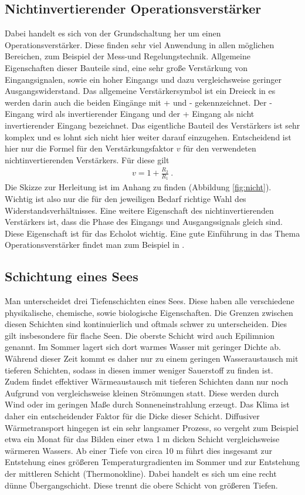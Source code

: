 \documentclass[12pt,a4paper,titlepage,headinclude,bibtotoc]{scrartcl}
\numberwithin{equation}{subsection}
\begin{document}
\subsection{Nichtinvertierender Operationsverstärker}
\label{sec:teoverstaerker}
Dabei handelt es sich von der Grundschaltung her um einen Operationsverstärker.
Diese finden sehr viel Anwendung in allen möglichen Bereichen, zum Beispiel der Mess-und Regelungstechnik. 
Allgemeine Eigenschaften dieser Bauteile sind, eine sehr große Verstärkung von Eingangsignalen, sowie ein hoher Eingangs und dazu vergleichsweise geringer Ausgangswiderstand.
Das allgemeine Verstärkersymbol ist ein Dreieck in es werden darin auch die beiden
Eingänge mit + und - gekennzeichnet.
Der - Eingang wird als invertierender Eingang und 
der + Eingang als nicht invertierender Eingang bezeichnet.
Das eigentliche Bauteil des Verstärkers ist sehr komplex und es lohnt sich nicht hier 
weiter darauf einzugehen.
Entscheidend ist hier nur die Formel für den Verstärkungsfaktor $v$ für den verwendeten 
nichtinvertierenden Verstärkers. 
Für diese gilt
\begin{align}
 v = 1 + \frac{R_2}{R_1}~.\label{eq:verst}
\end{align}
Die Skizze zur Herleitung ist im Anhang zu finden (Abbildung \ref{fig:nicht}).
Wichtig ist also nur die für den jeweiligen Bedarf richtige Wahl des Widerstandsverhältnisses.
Eine weitere Eigenschaft des nichtinvertierenden Verstärkers ist, dass die Phase des Eingangs und Ausgangssignals gleich sind.
Diese Eigenschaft ist für das Echolot wichtig. Eine gute Einführung in das Thema Operationsverstärker findet man zum Beispiel in \cite{op}.


\subsection{Schichtung eines Sees}

Man unterscheidet drei Tiefenschichten eines Sees.
Diese haben alle verschiedene physikalische, chemische, sowie biologische Eigenschaften.
Die Grenzen zwischen diesen Schichten sind kontinuierlich und oftmals schwer zu unterscheiden. 
Dies gilt insbesondere für flache Seen.
Die oberste Schicht wird auch Epilimnion genannt. 
Im Sommer lagert sich dort warmes Wasser mit geringer Dichte ab.
Während dieser Zeit kommt es daher nur zu einem geringen Wasseraustausch mit tieferen Schichten, sodass in diesen immer weniger Sauerstoff zu finden ist.
Zudem findet effektiver Wärmeaustausch mit tieferen Schichten dann nur noch Aufgrund von vergleichsweise kleinen Strömungen statt.
Diese werden durch Wind oder im geringen Maße durch Sonneneinstrahlung erzeugt. 
Das Klima ist daher ein entscheidender Faktor für die Dicke dieser Schicht.
Diffusiver Wärmetransport hingegen ist ein sehr langsamer Prozess, so vergeht zum Beispiel etwa ein Monat für das Bilden einer etwa 1 m dicken Schicht vergleichsweise wärmeren Wassers.
Ab einer Tiefe von circa 10 m führt dies insgesamt zur Entstehung eines größeren Temperaturgradienten im Sommer und zur Entstehung der mittleren Schicht (Thermonokline).
Dabei handelt es sich um eine recht dünne Übergangschicht.
Diese trennt die obere Schicht von größeren Tiefen. 
\newline
\end{document}
